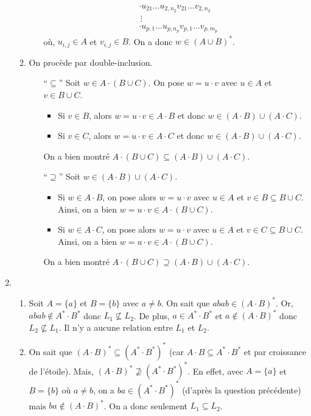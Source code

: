 \begin{enumerate}
\begin{enumerate}[label=\textit{(\arabic*)}]
\begin{itemize}
\begin{align*}
								 & \cdot u_{21}\ldots u_{2,n_2}v_{21}\ldots v_{2,n_2}\\
								 &\,\vdots\\
								 &\cdot u_{p,1}\ldots u_{p,n_p}v_{p,1}\ldots v_{p,m_p}
						\end{align*}
						où, $u_{i,j} \in A$\/ et $v_{i,j} \in B$. On a donc $w \in (A \cup  B)^*$.
				\end{itemize}
			\item On procède par double-inclusion.
				\begin{itemize}
					\item[``$\subseteq$''] Soit $w \in A \cdot (B \cup C)$. On pose $w = u \cdot v$\/ avec $u \in A$\/ et $v \in B \cup C$.
						\begin{itemize}
							\item  Si $v \in B$, alors $w = u \cdot v \in A \cdot B$\/ et donc $w \in (A \cdot B) \cup (A\cdot C)$.
							\item  Si $v \in C$, alors $w = u \cdot v \in A \cdot C$\/ et donc $w \in (A \cdot B) \cup (A\cdot C)$.
						\end{itemize}
						On a bien montré $A \cdot (B \cup C) \subseteq (A\cdot B) \cup (A\cdot C)$.
					\item[``$\supseteq$''] Soit $w \in (A\cdot B) \cup (A\cdot C)$.
						\begin{itemize}
							\item Si $w \in A\cdot B$, on pose alors $w = u \cdot v$\/ avec $u \in A$\/ et $v \in B \subseteq B \cup C$. Ainsi, on a bien $w = u \cdot v \in A \cdot (B \cup C)$.
							\item Si $w \in A\cdot C$, on pose alors $w = u \cdot v$\/ avec $u \in A$\/ et $v \in C \subseteq B \cup C$. Ainsi, on a bien $w = u \cdot v \in A \cdot (B \cup C)$.
						\end{itemize}
						On a bien montré $A \cdot (B \cup C) \supseteq (A\cdot B) \cup (A\cdot C)$.
				\end{itemize}
		\end{enumerate}
	\item
		\begin{enumerate}[label=\textit{(\arabic*)}]
			\item Soit $A = \{a\}$\/ et $B = \{b\}$\/ avec $a \neq b$. On sait que $abab \in (A\cdot B)^*$. Or, $abab \not\in A^* \cdot B^*$\/ donc $L_1 \not\subseteq L_2$.
				De plus, $a \in A^* \cdot B^*$\/ et $a \not\in  (A\cdot B)^*$\/ donc $L_2 \not\subseteq L_1$. Il n'y a aucune relation entre $L_1$\/ et $L_2$.
			\item On sait que $(A\cdot B)^* \subseteq (A^* \cdot B^*)^*$\/ (car $A \cdot B \subseteq A^* \cdot B^*$ et par croissance de l'étoile). Mais, $(A\cdot B)^* \not\supseteq (A^* \cdot B^*)^*$. En effet, avec $A = \{a\}$\/ et $B = \{b\}$\/ où $a \neq b$, on a $ba \in (A^* \cdot B^*)^*$\/ (d'après la question précédente) mais $ba \not\in (A\cdot B)^*$. On a donc seulement $L_1 \subseteq L_2$.

\end{enumerate}
\end{enumerate}
